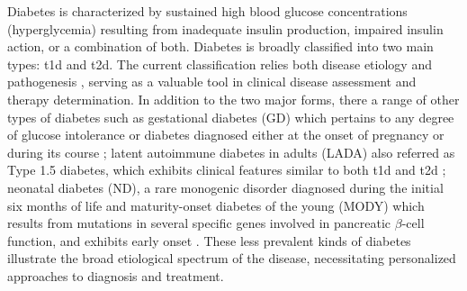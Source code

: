 \par Diabetes is characterized by sustained high blood glucose concentrations (hyperglycemia) resulting from inadequate insulin production, impaired insulin action, or a combination of both. Diabetes is broadly classified into two main types: \gls{t1d} and \acrfull{t2d}. The current classification relies both disease etiology and pathogenesis \textbf{\cite{banday_pathophysiology_2020}}, serving as a valuable tool in clinical disease assessment and therapy determination. In addition to the two major forms, there a range of other types of diabetes such as gestational diabetes (GD) which pertains to any degree of glucose intolerance or diabetes diagnosed either at the onset of pregnancy or during its course \textbf{\cite{banday_pathophysiology_2020,egan_what_2019}}; latent autoimmune diabetes in adults (LADA) also referred as Type 1.5 diabetes, which exhibits clinical features similar to both \gls{t1d} and \gls{t2d} \textbf{\cite{banday_pathophysiology_2020,naik_latent_2003}}; neonatal diabetes (ND), a rare monogenic disorder diagnosed during the initial six months of life \textbf{\cite{banday_pathophysiology_2020,polak_neonatal_2007}} and maturity-onset diabetes of the young (MODY) which results from mutations in several specific genes involved in pancreatic $\beta$-cell function, and exhibits early onset \textbf{\cite{banday_pathophysiology_2020,american_diabetes_association_2_2020}}. These less prevalent kinds of diabetes illustrate the broad etiological spectrum of the disease, necessitating personalized approaches to diagnosis and treatment.





